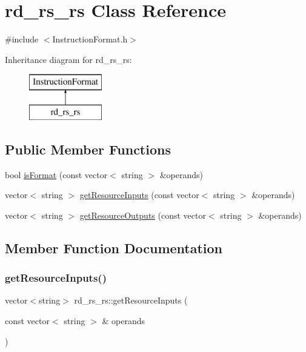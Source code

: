 \hypertarget{classrd__rs__rs}{}\section{rd\+\_\+rs\+\_\+rs Class Reference}
\label{classrd__rs__rs}


{\ttfamily \#include $<$Instruction\+Format.\+h$>$}

Inheritance diagram for rd\+\_\+rs\+\_\+rs\+:\begin{figure}[H]
\begin{center}
\leavevmode
\includegraphics[height=2.000000cm]{classrd__rs__rs}
\end{center}
\end{figure}
\subsection*{Public Member Functions}
\begin{DoxyCompactItemize}
\item 
bool \hyperlink{classrd__rs__rs_a9f92e9d08e1cc714507225a0fd961aba}{is\+Format} (const vector$<$ string $>$ \&operands)
\item 
vector$<$ string $>$ \hyperlink{classrd__rs__rs_a1df3edc555878b75cbd426889c28cec0}{get\+Resource\+Inputs} (const vector$<$ string $>$ \&operands)
\item 
vector$<$ string $>$ \hyperlink{classrd__rs__rs_ae2fd5d87f3db344ce4f8cea452ef6913}{get\+Resource\+Outputs} (const vector$<$ string $>$ \&operands)
\end{DoxyCompactItemize}


\subsection{Member Function Documentation}
\mbox{\label{classrd__rs__rs_a1df3edc555878b75cbd426889c28cec0}} 
\subsubsection{\texorpdfstring{get\+Resource\+Inputs()}{getResourceInputs()}}
{\footnotesize\ttfamily vector$<$string$>$ rd\+\_\+rs\+\_\+rs\+::get\+Resource\+Inputs (\begin{DoxyParamCaption}\item[{const vector$<$ string $>$ \&}]{operands }\end{DoxyParamCaption})\hspace{0.3cm}{\ttfamily [virtual]}}

